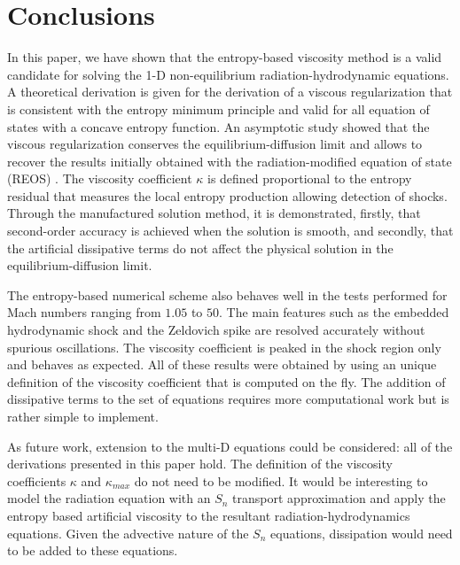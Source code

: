 \documentclass[review]{elsarticle}
\begin{document}
\section{Conclusions}
\label{sec:ccl}

In this paper, we have shown that the entropy-based viscosity method is a valid candidate for solving the 1-D non-equilibrium radiation-hydrodynamic equations. A theoretical derivation is given for the derivation of a viscous regularization that is consistent with the entropy minimum principle and valid for all equation of states with a concave entropy function. An asymptotic study showed that the viscous regularization conserves the equilibrium-diffusion limit and allows to recover the results initially obtained with the radiation-modified equation of state (REOS) \cite{LowrieMorel}. The viscosity coefficient $\kappa$ is defined proportional to the entropy residual that measures the local entropy production allowing detection of shocks. Through the manufactured solution method, it is demonstrated, firstly, that second-order accuracy is achieved when the solution is smooth, and secondly, that the artificial dissipative terms do not affect the physical solution in the equilibrium-diffusion limit. 

The entropy-based numerical scheme also behaves well in the tests performed for Mach numbers ranging from $1.05$ to $50$. The main features such as the embedded hydrodynamic shock and the Zeldovich spike are resolved accurately without spurious oscillations. The viscosity coefficient is peaked in the shock region only and behaves as expected. All of these results were obtained by using an unique definition of the viscosity coefficient that is computed on the fly. The addition of dissipative terms to the set of equations requires more computational work but is rather simple to implement.

As future work, extension to the multi-D equations could be considered: all of the derivations presented in this paper hold. The definition of the viscosity coefficients $\kappa$ and $\kappa_{max}$ do not need to be modified. It would be interesting to model the radiation equation with an $S_n$ transport approximation and apply the entropy based artificial viscosity to the resultant radiation-hydrodynamics equations. Given the advective nature of the $S_n$ equations, dissipation would need to be added to these equations.
\end{document}
